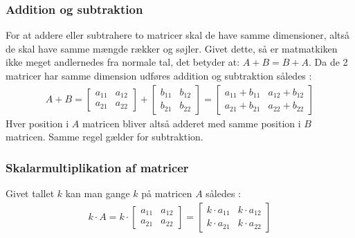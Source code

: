 \documentclass{article}
\begin{document}
\subsubsection{Addition og subtraktion}
For at addere eller subtrahere to matricer skal de have samme dimensioner, altså de skal have samme mængde rækker og søjler. Givet dette, så er matmatkiken ikke meget andlernedes fra normale tal, det betyder at: $A + B = B + A$. Da de 2 matricer har samme dimension udføres addition og subtraktion således \parencite{Lauritzen_2019}:
\begin{align}
  A + B = \begin{bmatrix}
    a_{11} & a_{12} \\
    a_{21} & a_{22}
  \end{bmatrix} + \begin{bmatrix}
    b_{11} & b_{12} \\
    b_{21} & b_{22}
  \end{bmatrix} = \begin{bmatrix}
    a_{11} + b_{11} & a_{12} + b_{12} \\
    a_{21} + b_{21} & a_{22} + b_{22}
  \end{bmatrix}
\end{align}
Hver position i $A$ matricen bliver altså adderet med samme position i $B$ matricen. Samme regel gælder for subtraktion.
\subsubsection{Skalarmultiplikation af matricer}
Givet tallet $k$ kan man gange $k$ på matricen $A$ således \parencite{Lauritzen_2019}:
\begin{align}
  k \cdot A = k \cdot \begin{bmatrix}
    a_{11} & a_{12} \\
    a_{21} & a_{22}
  \end{bmatrix} = \begin{bmatrix}
    k \cdot a_{11} & k \cdot a_{12} \\
    k \cdot a_{21} & k \cdot a_{22}
  \end{bmatrix}
\end{align}
\end{document}
